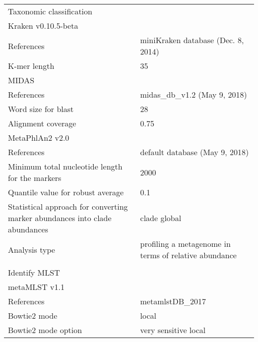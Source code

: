 \begin{table}[h!]
{\begin{tabular}{ll}
\multicolumn{2}{l}{Taxonomic classification}                                            \\
Kraken v0.10.5-beta                                &                                    \\
References                                         & miniKraken database (Dec. 8, 2014) \\
K-mer length                                       & 35                                 \\
MIDAS                                              &                                    \\
References                                         & midas\_db\_v1.2 (May 9, 2018)      \\
Word size for blast                                & 28                                 \\
Alignment coverage                                 & 0.75                               \\
MetaPhlAn2 v2.0                                    &                                    \\
References                                         & default database (May 9, 2018)     \\
Minimum total nucleotide length for the markers    & 2000                               \\
Quantile value for robust average                  & 0.1                                \\
Statistical approach for converting marker abundances into clade abundances & clade global                                          \\
Analysis type                                                               & profiling a metagenome in terms of relative abundance \\
                                                   &                                    \\
\multicolumn{2}{l}{Identify MLST}                                                       \\
metaMLST v1.1                                      &                                    \\
References                                         & metamlstDB\_2017                   \\
Bowtie2 mode                                       & local                              \\
Bowtie2 mode option                                & very sensitive local               \\

\end{tabular}}
\end{table}
